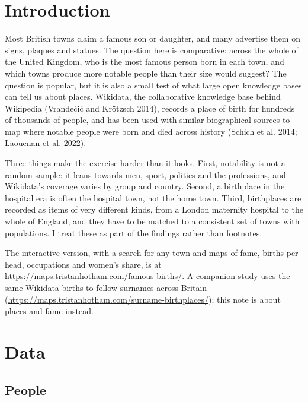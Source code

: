\documentclass[11pt,a4paper]{article}
\begin{document}
\section{Introduction}

Most British towns claim a famous son or daughter, and many advertise them on signs, plaques and statues. The question here is comparative: across the whole of the United Kingdom, who is the most famous person born in each town, and which towns produce more notable people than their size would suggest? The question is popular, but it is also a small test of what large open knowledge bases can tell us about places. Wikidata, the collaborative knowledge base behind Wikipedia (Vrandečić and Krötzsch 2014), records a place of birth for hundreds of thousands of people, and has been used with similar biographical sources to map where notable people were born and died across history (Schich et al. 2014; Laouenan et al. 2022).

Three things make the exercise harder than it looks. First, notability is not a random sample: it leans towards men, sport, politics and the professions, and Wikidata's coverage varies by group and country. Second, a birthplace in the hospital era is often the hospital town, not the home town. Third, birthplaces are recorded as items of very different kinds, from a London maternity hospital to the whole of England, and they have to be matched to a consistent set of towns with populations. I treat these as part of the findings rather than footnotes.

The interactive version, with a search for any town and maps of fame, births per head, occupations and women's share, is at \url{https://maps.tristanhotham.com/famous-births/}. A companion study uses the same Wikidata births to follow surnames across Britain (\url{https://maps.tristanhotham.com/surname-birthplaces/}); this note is about places and fame instead.

\section{Data}

\subsection{People}
\end{document}

